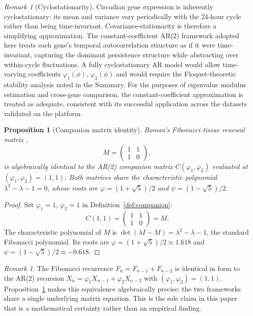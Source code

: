 \documentclass[11pt,letterpaper]{article}
\newtheorem{proposition}[theorem]{Proposition}
\theoremstyle{definition}
\theoremstyle{remark}
\newtheorem{remark}[theorem]{Remark}
\begin{document}
\begin{remark}[Cyclostationarity]
Circadian gene expression is inherently cyclostationary: its mean and variance vary periodically with the 24-hour cycle rather than being time-invariant. Covariance-stationarity is therefore a simplifying approximation. The constant-coefficient AR(2) framework adopted here treats each gene's temporal autocorrelation structure as if it were time-invariant, capturing the dominant persistence structure while abstracting over within-cycle fluctuations. A fully cyclostationary AR model would allow time-varying coefficients $\varphi_1(\phi)$, $\varphi_2(\phi)$ and would require the Floquet-theoretic stability analysis noted in the Summary. For the purposes of eigenvalue modulus estimation and cross-gene comparison, the constant-coefficient approximation is treated as adequate, consistent with its successful application across the datasets validated on the platform.
\end{remark}

\begin{proposition}[Companion matrix identity]\label{prop:companion}
Boman's Fibonacci tissue renewal matrix \citep{boman2017fibonacci},
\[
  M = \begin{pmatrix} 1 & 1 \\ 1 & 0 \end{pmatrix},
\]
is algebraically identical to the AR(2) companion matrix $C(\varphi_1, \varphi_2)$ evaluated at $(\varphi_1, \varphi_2) = (1, 1)$. Both matrices share the characteristic polynomial $\lambda^2 - \lambda - 1 = 0$, whose roots are $\varphi = (1+\sqrt{5})/2$ and $\psi = (1-\sqrt{5})/2$.
\end{proposition}

\begin{proof}
Set $\varphi_1 = 1$, $\varphi_2 = 1$ in Definition~\ref{def:companion}:
\[
  C(1,1) = \begin{pmatrix}1&1\\1&0\end{pmatrix} = M.
\]
The characteristic polynomial of $M$ is $\det(\lambda I - M) = \lambda^2 - \lambda - 1$, the standard Fibonacci polynomial. Its roots are $\varphi = (1+\sqrt{5})/2 \approx 1.618$ and $\psi = (1-\sqrt{5})/2 \approx -0.618$.
\end{proof}

\begin{remark}
The Fibonacci recurrence $F_n = F_{n-1} + F_{n-2}$ is identical in form to the AR(2) recursion $X_n = \varphi_1 X_{n-1} + \varphi_2 X_{n-2}$ with $(\varphi_1,\varphi_2)=(1,1)$. Proposition~\ref{prop:companion} makes this equivalence algebraically precise: the two frameworks share a single underlying matrix equation. This is the sole claim in this paper that is a mathematical certainty rather than an empirical finding.
\end{remark}
\end{document}
